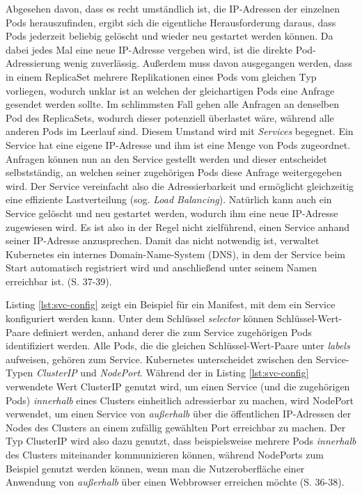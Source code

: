 \documentclass[11pt,a4paper]{article}
\begin{document}
Abgesehen davon, dass es recht umständlich ist, die IP-Adressen der einzelnen Pods herauszufinden,
ergibt sich die eigentliche Herausforderung daraus, dass Pods jederzeit beliebig gelöscht
und wieder neu gestartet werden können. Da dabei jedes Mal eine neue IP-Adresse vergeben wird,
ist die direkte Pod-Adressierung wenig zuverlässig. Außerdem muss davon ausgegangen werden, dass
in einem ReplicaSet mehrere Replikationen eines Pods vom gleichen Typ vorliegen, wodurch unklar ist
an welchen der gleichartigen Pods eine Anfrage gesendet werden sollte. Im schlimmsten Fall gehen alle Anfragen
an denselben Pod des ReplicaSets, wodurch dieser potenziell überlastet wäre, während alle anderen Pods im Leerlauf sind.
Diesem Umstand wird mit \emph{Services} begegnet. Ein Service hat eine eigene IP-Adresse und ihm ist eine Menge
von Pods zugeordnet. Anfragen können nun an den Service gestellt werden und dieser entscheidet selbstständig,
an welchen seiner zugehörigen Pods diese Anfrage weitergegeben wird. Der Service vereinfacht also die
Adressierbarkeit und ermöglicht gleichzeitig eine effiziente Lastverteilung (sog. \emph{Load Balancing}).
Natürlich kann auch ein Service gelöscht und neu gestartet werden, wodurch ihm eine neue IP-Adresse zugewiesen wird.
Es ist also in der Regel nicht zielführend, einen Service anhand seiner IP-Adresse anzusprechen.
Damit das nicht notwendig ist, verwaltet Kubernetes ein internes Domain-Name-System (DNS), in dem
der Service beim Start automatisch registriert wird und anschließend unter seinem Namen
erreichbar ist. \cite{Schmeling_Dargatz_2022} (S. 37-39).

Listing \ref{lst:svc-config} zeigt ein Beispiel für ein Manifest,
mit dem ein Service konfiguriert werden kann.
Unter dem Schlüssel \emph{selector} können Schlüssel-Wert-Paare definiert werden,
anhand derer die zum Service zugehörigen Pods identifiziert werden. Alle Pods, die
die gleichen Schlüssel-Wert-Paare unter \emph{labels} aufweisen, gehören zum Service.
Kubernetes unterscheidet zwischen den Service-Typen \emph{ClusterIP} und \emph{NodePort}.
Während der in Listing \ref{lst:svc-config} verwendete Wert ClusterIP genutzt wird, um einen Service
(und die zugehörigen Pods) \emph{innerhalb} eines Clusters
einheitlich adressierbar zu machen, wird NodePort verwendet, um einen Service von \emph{außerhalb}
über die öffentlichen IP-Adressen der Nodes des Clusters
an einem zufällig gewählten Port erreichbar zu machen.
Der Typ ClusterIP wird also dazu genutzt, dass beispielsweise mehrere Pods \emph{innerhalb}
des Clusters miteinander kommunizieren können, während NodePorts zum Beispiel genutzt werden können,
wenn man die Nutzeroberfläche einer Anwendung von \emph{außerhalb}
über einen Webbrowser erreichen möchte \cite{Schmeling_Dargatz_2022} (S. 36-38).

\end{document}
